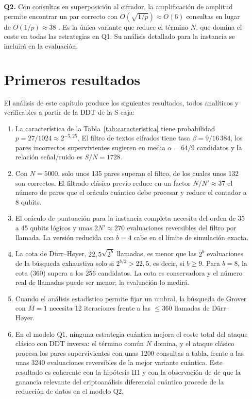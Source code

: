 \textbf{Q2.} Con consultas en superposición al cifrador, la amplificación de amplitud permite encontrar un par correcto con \(O(\sqrt{1/p})\approx O(6)\) consultas en lugar de \(O(1/p)\approx 38\) \citep{kaplan2016diff}. Es la única variante que reduce el término \(N\), que domina el coste en todas las estrategias en Q1. Su análisis detallado para la instancia se incluirá en la evaluación.

\section{Primeros resultados}
\label{sec:resultados-prelim}

El análisis de este capítulo produce los siguientes resultados, todos analíticos y verificables a partir de la DDT de la S-caja:

\begin{enumerate}
 \item[R1.] La característica de la Tabla~\ref{tab:caracteristica} tiene probabilidad \(p=27/1024\approx 2^{-5{,}25}\). El filtro de textos cifrados tiene tasa \(\beta=9/16\,384\), los pares incorrectos supervivientes sugieren en media \(\alpha=64/9\) candidatos y la relación señal/ruido es \(S/N=1728\).
 \item[R2.] Con \(N=5000\), solo unos 135 pares superan el filtro, de los cuales unos 132 son correctos. El filtrado clásico previo reduce en un factor \(N/N'\approx 37\) el número de pares que el oráculo cuántico debe procesar y reduce el contador a 8 qubits.
 \item[R3.] El oráculo de puntuación para la instancia completa necesita del orden de 35 a 45 qubits lógicos y unas \(2N'\approx 270\) evaluaciones reversibles del filtro por llamada. La versión reducida con \(b=4\) cabe en el límite de simulación exacta.
 \item[R4.] La cota de Dürr--Høyer, \(22{,}5\sqrt{2^b}\) llamadas, es menor que las \(2^b\) evaluaciones de la búsqueda exhaustiva solo si \(2^{b/2}>22{,}5\), es decir, si \(b\ge 9\). Para \(b=8\), la cota (360) supera a los 256 candidatos. La cota es conservadora y el número real de llamadas puede ser menor; la evaluación lo medirá.
 \item[R5.] Cuando el análisis estadístico permite fijar un umbral, la búsqueda de Grover con \(M=1\) necesita 12 iteraciones frente a las \(\le 360\) llamadas de Dürr--Høyer.
 \item[R6.] En el modelo Q1, ninguna estrategia cuántica mejora el coste total del ataque clásico con DDT inversa: el término común \(N\) domina, y el ataque clásico procesa los pares supervivientes con unas 1200 consultas a tabla, frente a las unas 3240 evaluaciones reversibles de la mejor variante cuántica. Este resultado es coherente con la hipótesis H1 y con la observación de \citet{kaplan2016diff} de que la ganancia relevante del criptoanálisis diferencial cuántico procede de la reducción de datos en el modelo Q2.
\end{enumerate}

